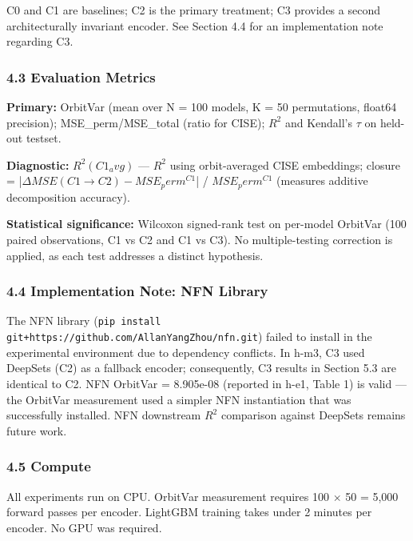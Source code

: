 \begin{table}[htbp]
\centering
{}
\end{table}

C0 and C1 are baselines; C2 is the primary treatment; C3 provides a second architecturally invariant encoder. See Section 4.4 for an implementation note regarding C3.

\subsubsection{4.3 Evaluation Metrics}

\textbf{Primary:} OrbitVar (mean over N = 100 models, K = 50 permutations, float64 precision); MSE\_perm/MSE\_total (ratio for CISE); $R^2$ and Kendall's $\tau$ on held-out testset.

\textbf{Diagnostic:} $R^{2}(C1_avg)$ --- $R^2$ using orbit-averaged CISE embeddings; closure = |$\Delta MSE(C1\rightarrow C2) - MSE_perm^{C1}$| / $MSE_perm^{C1}$ (measures additive decomposition accuracy).

\textbf{Statistical significance:} Wilcoxon signed-rank test on per-model OrbitVar (100 paired observations, C1 vs C2 and C1 vs C3). No multiple-testing correction is applied, as each test addresses a distinct hypothesis.

\subsubsection{4.4 Implementation Note: NFN Library}

The NFN library (\texttt{pip install git+https://github.com/AllanYangZhou/nfn.git}) failed to install in the experimental environment due to dependency conflicts. In h-m3, C3 used DeepSets (C2) as a fallback encoder; consequently, C3 results in Section 5.3 are identical to C2. NFN OrbitVar = 8.905e-08 (reported in h-e1, Table 1) is valid --- the OrbitVar measurement used a simpler NFN instantiation that was successfully installed. NFN downstream $R^2$ comparison against DeepSets remains future work.

\subsubsection{4.5 Compute}

All experiments run on CPU. OrbitVar measurement requires 100 $\times$ 50 = 5,000 forward passes per encoder. LightGBM training takes under 2 minutes per encoder. No GPU was required.

